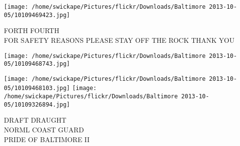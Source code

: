 \documentclass[10pt,letterpaper]{article}
\begin{document}
\vspace{0.25in}
\texttt{[image: /home/swickape/Pictures/flickr/Downloads/Baltimore 2013-10-05/10109469423.jpg]}

FORTH FOURTH\\
FOR SAFETY REASONS PLEASE STAY OFF THE ROCK THANK YOU\\
\pagebreak

\texttt{[image: /home/swickape/Pictures/flickr/Downloads/Baltimore 2013-10-05/10109468743.jpg]}

\vspace{0.25in}
\texttt{[image: /home/swickape/Pictures/flickr/Downloads/Baltimore 2013-10-05/10109468103.jpg]}
\texttt{[image: /home/swickape/Pictures/flickr/Downloads/Baltimore 2013-10-05/10109326894.jpg]}

DRAFT DRAUGHT\\
NORML COAST GUARD\\
PRIDE OF BALTIMORE II\\
\pagebreak
\end{document}
